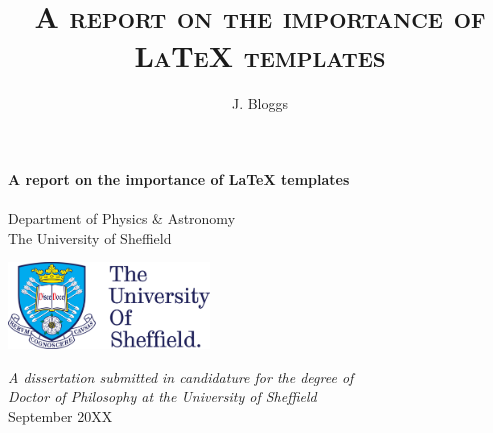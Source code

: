 \title{\textsc{A report on the importance of \LaTeX{} templates}}
\author{J. Bloggs}

\thispagestyle{empty}

\begin{center}
\fontsize{24.88}{57.6}
\vspace*{-1cm}

\textbf{A report on the importance of \LaTeX{} templates}\\
\vspace*{2.5cm}
\LARGE
{}\\
\vspace{2cm}
\Large{Department of Physics \& Astronomy}\\
\Large{The University of Sheffield}\\
\vspace*{1cm}

\includegraphics[width=0.4\textwidth]{./images/University_of_Sheffield_logo.png}\\

\vspace*{1cm}

\large
{\it A dissertation submitted in candidature for the degree of}\\
{\it Doctor of Philosophy at the University of Sheffield}\\
\vspace*{1.5cm}
{September 20XX}
\vfill
\end{center}

\normalsize %

\afterpage{\blankpage}
